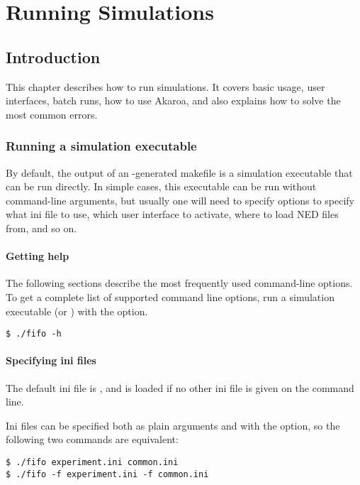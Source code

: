\chapter{Running Simulations}
\label{cha:run-sim}

\section{Introduction}

This chapter describes how to run simulations. It covers basic usage,
user interfaces, batch runs, how to use Akaroa, and also explains
how to solve the most common errors.

\subsection{Running a simulation executable}

By default, the output of an -generated makefile is
a simulation executable that can be run directly. In simple cases,
this executable can be run without command-line arguments, but usually
one will need to specify options to specify what ini file to use,
which user interface to activate, where to load NED files from, and so on.

\subsubsection{Getting help}

The following sections describe the most frequently used command-line
options. To get a complete list of supported command line options, run
a simulation executable (or ) with the  option.

\begin{verbatim}
$ ./fifo -h
\end{verbatim}

\subsubsection{Specifying ini files}

The default ini file is , and is
loaded if no other ini file is given on the command line.

Ini files can be specified both as plain arguments and with the 
option, so the following two commands are equivalent:

\begin{verbatim}
$ ./fifo experiment.ini common.ini
$ ./fifo -f experiment.ini -f common.ini
\end{verbatim}

